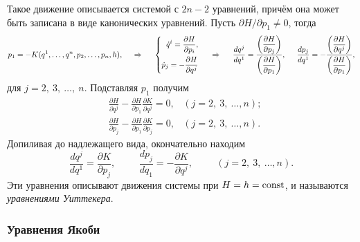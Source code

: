 Такое движение описывается системой с $2n-2$ уравнений, причём она может быть записана в виде канонических уравнений. Пусть $\partial H / \partial p_1 \neq 0$, тогда
\begin{equation*}
    p_1 = - K(q^1, \ldots, q^n, p_2, \ldots, p_n, h),
    \hspace{0.5cm} \Rightarrow \hspace{0.5cm} 
    \left\{\begin{aligned}
        \dot{q}^i = \frac{\partial H}{\partial p_i}, \\
        \dot{p}_j = - \frac{\partial H}{\partial q^j}        
    \end{aligned}\right.
    \hspace{0.5cm} \Rightarrow \hspace{0.5cm} 
    \frac{d q^j}{d q^1} = \frac{
    \left(\dfrac{\partial H}{\partial p_j} \right)
    }{
    \left(\dfrac{\partial H}{\partial p_1} \right)
    },
    \hspace{0.5cm} 
    \frac{d p_j}{d q^1} = - \frac{
    \left(\dfrac{\partial H}{\partial q^j}\right)
    }{
    \left(\dfrac{\partial H}{\partial p_1} \right)
    },
\end{equation*}
для $j = 2,\ 3,\ \ldots,\ n$. Подставляя $p_1$ получим
\begin{align*}
    &\frac{\partial H}{\partial q^j} - \frac{\partial H}{\partial p_1} \frac{\partial K}{\partial q^j} = 0,
    &(j = 2, \ 3, \ \ldots, n);
    \\
    &\frac{\partial H}{\partial p_j} - \frac{\partial H}{\partial p_1} \frac{\partial K}{\partial p_j}  = 0,
    &(j = 2, \ 3, \ \ldots, n).
\end{align*}
Допиливая до надлежащего вида, окончательно находим
\begin{equation*}
    \frac{d q^j}{d q^1} = \frac{\partial K}{\partial p_j},
    \hspace{1cm} 
    \frac{d p_j}{d q_1} = - \frac{\partial K}{\partial q^j},
    \hspace{1cm} 
    (j = 2, \ 3, \ \ldots, n).
\end{equation*}
Эти уравнения описывают движения системы при $H = h = \text{const}$, и называются \textit{уравнениями Уиттекера}. 

\subsubsection*{Уравнения Якоби}


